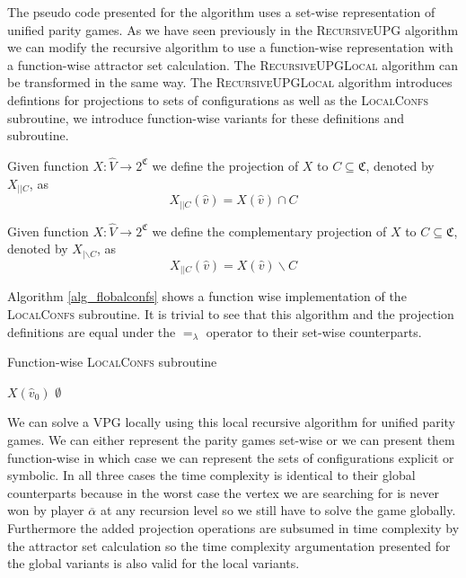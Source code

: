 The pseudo code presented for the algorithm uses a set-wise representation of unified parity games. As we have seen previously in the \textsc{RecursiveUPG} algorithm we can modify the recursive algorithm to use a function-wise representation with a function-wise attractor set calculation. The \textsc{RecursiveUPGLocal} algorithm can be transformed in the same way. The \textsc{RecursiveUPGLocal} algorithm introduces defintions for projections to sets of configurations as well as the \textsc{LocalConfs} subroutine, we introduce function-wise variants for these definitions and subroutine.
\begin{definition}
	Given function $X : \hat{V} \rightarrow 2^\mathfrak{C}$ we define the projection of $X$ to $C \subseteq \mathfrak{C}$, denoted by $X_{||C}$, as
	\[ X_{||C}(\hat{v}) = X(\hat{v}) \cap C \]
\end{definition}
\begin{definition}
	Given function $X : \hat{V} \rightarrow 2^\mathfrak{C}$ we define the complementary projection of $X$ to $C \subseteq \mathfrak{C}$, denoted by $X_{|\backslash C}$, as
	\[ X_{||C}(\hat{v}) = X(\hat{v}) \backslash C \]
\end{definition}
Algorithm \ref{alg_flobalconfs} shows a function wise implementation of the \textsc{LocalConfs} subroutine. It is trivial to see that this algorithm and the projection definitions are equal under the $=_\lambda$ operator to their set-wise counterparts.
\begin{algorithm}
	\caption{Function-wise \textsc{LocalConfs} subroutine}
	\label{alg_flobalconfs}
	\begin{algorithmic}[1]
		\If{$\overline{\alpha} \in \Delta$}
		\State \Return $X(\hat{v}_0)$
		\Else
		\State \Return $\emptyset$
		\EndIf
		\EndFunction
	\end{algorithmic}
\end{algorithm}

We can solve a VPG locally using this local recursive algorithm for unified parity games. We can either represent the parity games set-wise or we can present them function-wise in which case we can represent the sets of configurations explicit or symbolic. In all three cases the time complexity is identical to their global counterparts because in the worst case the vertex we are searching for is never won by player $\overline{\alpha}$ at any recursion level so we still have to solve the game globally. Furthermore the added projection operations are subsumed in time complexity by the attractor set calculation so the time complexity argumentation presented for the global variants is also valid for the local variants. 